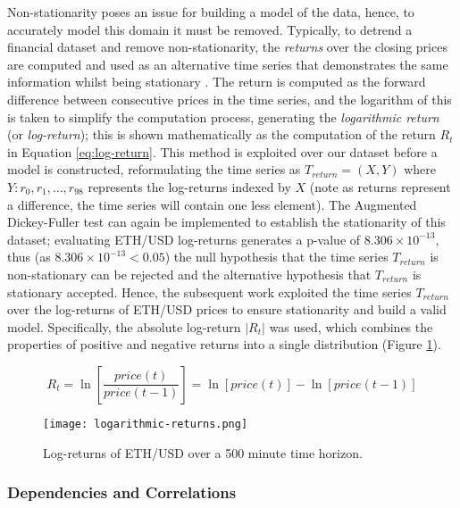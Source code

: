 \documentclass[a4paper, 11pt]{article}
\begin{document}
    Non-stationarity poses an issue for building a model of the data, hence, to accurately model this domain it must be removed. Typically, to detrend a financial dataset and remove non-stationarity, the \emph{returns} over the closing prices are computed and used as an alternative time series that demonstrates the same information whilst being stationary \cite{liu-2020}. The return is computed as the forward difference between consecutive prices in the time series, and the logarithm of this is taken to simplify the computation process, generating the \emph{logarithmic return} (or \emph{log-return}); this is shown mathematically as the computation of the return $R_t$ in Equation \ref{eq:log-return}. This method is exploited over our dataset before a model is constructed, reformulating the time series as $T_{return} = \left(X, Y \right)$ where $Y \colon r_0, r_1, \ldots, r_{98}$ represents the log-returns indexed by $X$ (note as returns represent a difference, the time series will contain one less element). The Augmented Dickey-Fuller test can again be implemented to establish the stationarity of this dataset; evaluating ETH/USD log-returns generates a p-value of $8.306 \times 10^{-13}$, thus (as $8.306 \times 10^{-13} < 0.05$) the null hypothesis that the time series $T_{return}$ is non-stationary can be rejected and the alternative hypothesis that $T_{return}$ is stationary accepted. Hence, the subsequent work exploited the time series $T_{return}$ over the log-returns of ETH/USD prices to ensure stationarity and build a valid model. Specifically, the absolute log-return $\lvert R_t \rvert$ was used, which combines the properties of positive and negative returns into a single distribution (Figure \ref{fig:returns}).

    \begin{equation}
        R_t = \ln \left[ \frac{price \left( t \right)}{price \left(t-1 \right)} \right] = \ln \left[ price \left(t \right) \right] - \ln \left[price \left(t-1 \right) \right]
        \label{eq:log-return}
    \end{equation}

    \begin{figure}[ht]
        \centering
        \caption{\centering Log-returns of ETH/USD over a 500 minute time horizon.}
        \texttt{[image: logarithmic-returns.png]}
        \label{fig:returns}
    \end{figure}

    \subsubsection{Dependencies and Correlations}
\end{document}
